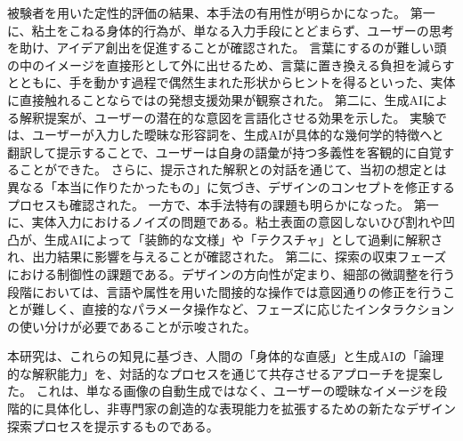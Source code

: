 \documentclass{kuisthesis}
\begin{document}
\begin{jabstract}
被験者を用いた定性的評価の結果、本手法の有用性が明らかになった。
第一に、粘土をこねる身体的行為が、単なる入力手段にとどまらず、ユーザーの思考を助け、アイデア創出を促進することが確認された。 
言葉にするのが難しい頭の中のイメージを直接形として外に出せるため、言葉に置き換える負担を減らすとともに、手を動かす過程で偶然生まれた形状からヒントを得るといった、実体に直接触れることならではの発想支援効果が観察された。
第二に、生成AIによる解釈提案が、ユーザーの潜在的な意図を言語化させる効果を示した。 
実験では、ユーザーが入力した曖昧な形容詞を、生成AIが具体的な幾何学的特徴へと翻訳して提示することで、ユーザーは自身の語彙が持つ多義性を客観的に自覚することができた。 
さらに、提示された解釈との対話を通じて、当初の想定とは異なる「本当に作りたかったもの」に気づき、デザインのコンセプトを修正するプロセスも確認された。
一方で、本手法特有の課題も明らかになった。 
第一に、実体入力におけるノイズの問題である。粘土表面の意図しないひび割れや凹凸が、生成AIによって「装飾的な文様」や「テクスチャ」として過剰に解釈され、出力結果に影響を与えることが確認された。 
第二に、探索の収束フェーズにおける制御性の課題である。デザインの方向性が定まり、細部の微調整を行う段階においては、言語や属性を用いた間接的な操作では意図通りの修正を行うことが難しく、直接的なパラメータ操作など、フェーズに応じたインタラクションの使い分けが必要であることが示唆された。

本研究は、これらの知見に基づき、人間の「身体的な直感」と生成AIの「論理的な解釈能力」を、対話的なプロセスを通じて共存させるアプローチを提案した。 
これは、単なる画像の自動生成ではなく、ユーザーの曖昧なイメージを段階的に具体化し、非専門家の創造的な表現能力を拡張するための新たなデザイン探索プロセスを提示するものである。
\end{jabstract}
\end{document}
